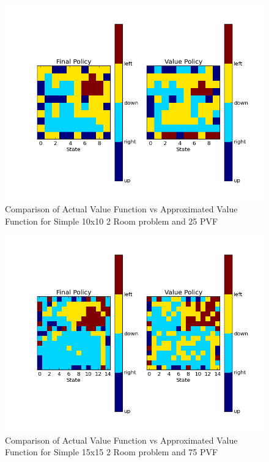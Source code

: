 \documentclass[12pt, letterpaper, final]{report}
\begin{document}
\FloatBarrier
\begin{figure}[h!]
\centering
\includegraphics[scale=.5]{images/paper_example_policy_comparison_k25_s5000_graph01.png}
\caption{Comparison of Actual Value Function vs Approximated Value
  Function for Simple 10x10 2 Room problem and 25 PVF}
\label{valueVsQ1}
\end{figure}
\FloatBarrier

\FloatBarrier
\begin{figure}[h!]
\centering
\includegraphics[scale=.5]{images/paper_example_big_policy_comparison_k75_graph01.png}
\caption{Comparison of Actual Value Function vs Approximated Value
  Function for Simple 15x15 2 Room problem and 75 PVF}
\label{valueVsQ2}
\end{figure}
\FloatBarrier
\end{document}
